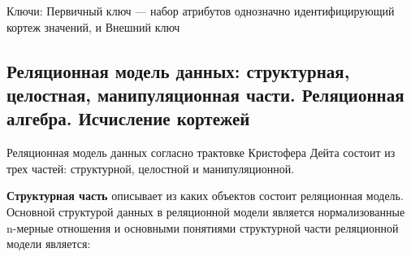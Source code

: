 Ключи: Первичный ключ --- набор атрибутов однозначно идентифицирующий кортеж значений, и Внешний ключ

\subsection{Реляционная модель данных: структурная, целостная, манипуляционная части. Реляционная алгебра. Исчисление кортежей}

Реляционная модель данных согласно трактовке Кристофера Дейта состоит из трех частей: структурной, целостной и манипуляционной.

\textbf{Структурная часть} описывает из каких объектов состоит реляционная модель. Основной структурой данных в реляционной модели является нормализованные n-мерные отношения и основными понятиями структурной части реляционной модели является:
